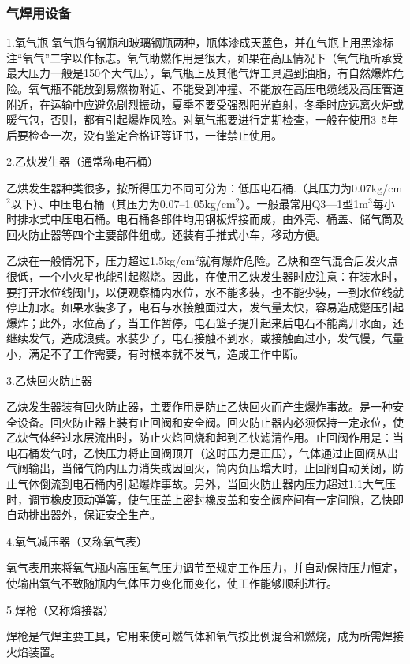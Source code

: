 \documentclass{ctexbook}
\begin{document}
\subsubsection{气焊用设备}
1.氧气瓶
氧气瓶有钢瓶和玻璃钢瓶两种，瓶体漆成天蓝色，并在气瓶上用黑漆标注“氧气”二字以作标志。氧气助燃作用是很大，如果在高压情况下（氧气瓶所承受最大压力一般是150个大气压），氧气瓶上及其他气焊工具遇到油脂，有自然爆炸危险。氧气瓶不能放到易燃物附近、不能受到冲撞、不能放在高压电缆线及高压管道附近，在运输中应避免剧烈振动，夏季不要受强烈阳光直射，冬季时应远离火炉或暖气包，否则，都有引起爆炸风险。对氧气瓶要进行定期检查，一般在使用3--5年后要检查一次，没有鉴定合格证等证书，一律禁止使用。

2.乙炔发生器（通常称电石桶）

乙烘发生器种类很多，按所得压力不同可分为：低压电石桶.（其压力为0.07kg/cm$^2$以下）、中压电石桶（其压力为0.07--1.05kg/cm$^2$）。一般最常用Q3—1型1m$^3$每小时排水式中压电石桶。电石桶各部件均用钢板焊接而成，由外壳、桶盖、储气筒及回火防止器等四个主要部件组成。还装有手推式小车，移动方便。

乙炔在一般情况下，压力超过1.5kg/cm$^2$就有爆炸危险。乙炔和空气混合后发火点很低，一个小火星也能引起燃烧。因此，在使用乙炔发生器时应注意：在装水时，要打开水位线阀门，以便观察桶内水位，水不能多装，也不能少装，一到水位线就停止加水。如果水装多了，电石与水接触面过大，发气量太快，容易造成蹩压引起爆炸；此外，水位高了，当工作暂停，电石篮子提升起来后电石不能离开水面，还继续发气，造成浪费。水装少了，电石接触不到水，或接触面过小，发气慢，气量小，满足不了工作需要，有时根本就不发气，造成工作中断。

3.乙炔回火防止器

乙炔发生器装有回火防止器，主要作用是防止乙炔回火而产生爆炸事故。是一种安全设备。回火防止器上装有止回阀和安全阀。回火防止器内必须保持一定永位，使乙炔气体经过水层流出时，防止火焰回烧和起到乙快滤清作用。止回阀作用是：当电石桶发气时，乙快压力将止回阀顶开（这时压力是正压），气体通过止回阀从出气阀输出，当储气筒内压力消失或因回火，筒内负压增大时，止回阀自动关闭，防止气体倒流到电石桶内引起爆炸事故。另外，当回火防止器内压力超过1.1大气压时，调节橡皮顶动弹簧，使气压盖上密封橡皮盖和安全阀座间有一定间隙，乙快即自动排出器外，保证安全生产。

4.氧气减压器（又称氧气表）

氧气表用来将氧气瓶内高压氧气压力调节至规定工作压力，并自动保持压力恒定，使输出氧气不致随瓶内气体压力变化而变化，使工作能够顺利进行。

5.焊枪（又称熔接器）

焊枪是气焊主要工具，它用来使可燃气体和氧气按比例混合和燃烧，成为所需焊接火焰装置。
\end{document}
